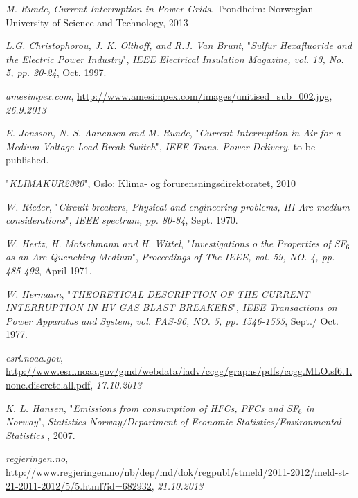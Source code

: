 \documentclass[10pt,a4paper]{article} %
\begin{document}
\newpage

\begin{thebibliography}{10}


 \textit{M. Runde}, \textit{Current Interruption in Power Grids}. Trondheim: Norwegian University of Science and Technology, 2013

 \textit{L.G. Christophorou, J. K. Olthoff, and R.J. Van Brunt}, "\textit{Sulfur Hexafluoride and the Electric Power Industry}", \textit{IEEE Electrical Insulation Magazine, vol. 13, No. 5, pp. 20-24}, Oct. 1997.

 \textit{amesimpex.com}, \url{http://www.amesimpex.com/images/unitised_sub_002.jpg}, \textit{26.9.2013}

 \textit{E. Jonsson, N. S. Aanensen and M. Runde}, "\textit{Current Interruption in Air for a Medium Voltage Load Break Switch}", \textit{IEEE Trans. Power Delivery}, to be published.

 "\textit{KLIMAKUR2020}", Oslo: Klima- og forurensningsdirektoratet, 2010

 \textit{W. Rieder}, "\textit{Circuit breakers, Physical and engineering problems, III-Arc-medium considerations}", \textit{IEEE spectrum, pp. 80-84}, Sept. 1970.

 \textit{W. Hertz, H. Motschmann and H. Wittel}, "\textit{Investigations o the Properties of SF$_6$ as an Arc Quenching Medium}", \textit{Proceedings of The IEEE, vol. 59, NO. 4, pp. 485-492}, April 1971.

 \textit{W. Hermann}, "\textit{THEORETICAL DESCRIPTION OF THE CURRENT INTERRUPTION IN HV GAS BLAST BREAKERS}", \textit{IEEE Transactions on Power Apparatus and System, vol. PAS-96, NO. 5, pp. 1546-1555}, Sept./ Oct. 1977.

 \textit{esrl.noaa.gov}, \url{http://www.esrl.noaa.gov/gmd/webdata/iadv/ccgg/graphs/pdfs/ccgg.MLO.sf6.1.none.discrete.all.pdf}, \textit{17.10.2013}

 \textit{K. L. Hansen}, "\textit{Emissions from consumption of HFCs, PFCs and SF$_6$ in Norway}", \textit{Statistics Norway/Department of Economic Statistics/Environmental Statistics
}, 2007.

 \textit{regjeringen.no}, \url{http://www.regjeringen.no/nb/dep/md/dok/regpubl/stmeld/2011-2012/meld-st-21-2011-2012/5/5.html?id=682932}, \textit{21.10.2013}



\end{thebibliography}
\end{document}
